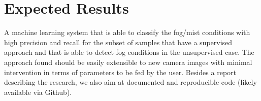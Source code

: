 \documentclass[conference]{IEEEtran}
\begin{document}
\section{Expected Results}

A machine learning system that is able to classify the fog/mist conditions with high precision and recall
for the subset of samples that have a supervised approach and that is able to detect fog conditions in the unsupervised case. The approach found should be easily extensible to new camera images with 
minimal intervention in terms of parameters to be fed by the user.
Besides a report describing the research, we also aim at documented and reproducible code (likely available via Github).  








\end{document}
